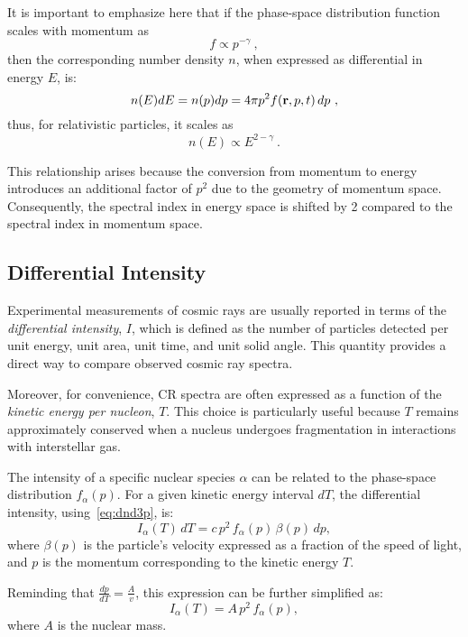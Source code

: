 It is important to emphasize here that if the phase-space distribution function scales with momentum as
\begin{equation}
f \propto p^{-\gamma}~,
\end{equation}
then the corresponding number density \( n\), when expressed as differential in energy \( E\), is:
\begin{equation}
n(E) dE = n(p) dp = 4 \pi p^2 f(\vb{r}, p, t) \, dp~,
\end{equation}
%
thus, for relativistic particles, it scales as
\begin{equation}
n(E) \propto E^{2-\gamma}~.
\end{equation}

This relationship arises because the conversion from momentum to energy introduces an additional factor of \(p^2\) due to the geometry of momentum space. Consequently, the spectral index in energy space is shifted by 2 compared to the spectral index in momentum space.  

\subsection{Differential Intensity}

Experimental measurements of cosmic rays are usually reported in terms of the \emph{differential intensity}, \(I\), which is defined as the number of particles detected per unit energy, unit area, unit time, and unit solid angle. This quantity provides a direct way to compare observed cosmic ray spectra.  

Moreover, for convenience, CR spectra are often expressed as a function of the \emph{kinetic energy per nucleon}, \(T\). This choice is particularly useful because \(T\) remains approximately conserved when a nucleus undergoes fragmentation in interactions with interstellar gas.  

The intensity of a specific nuclear species \(\alpha\) can be related to the phase-space distribution \(f_\alpha(p)\). 
%
For a given kinetic energy interval \(dT\), the differential intensity, using~\cref{eq:dnd3p}, is:  
\begin{equation}
I_\alpha(T) \, dT = c \, p^2 \, f_\alpha(p) \, \beta(p) \, dp,
\end{equation}
where \(\beta(p) \) is the particle’s velocity expressed as a fraction of the speed of light, and \(p\) is the momentum corresponding to the kinetic energy \(T\).  

Reminding that \( \frac{dp}{dT} = \frac{A}{v} \), this expression can be further simplified as:  
\[
I_\alpha(T) = A \, p^2 \, f_\alpha(p),
\]  
where \(A\) is the nuclear mass.
